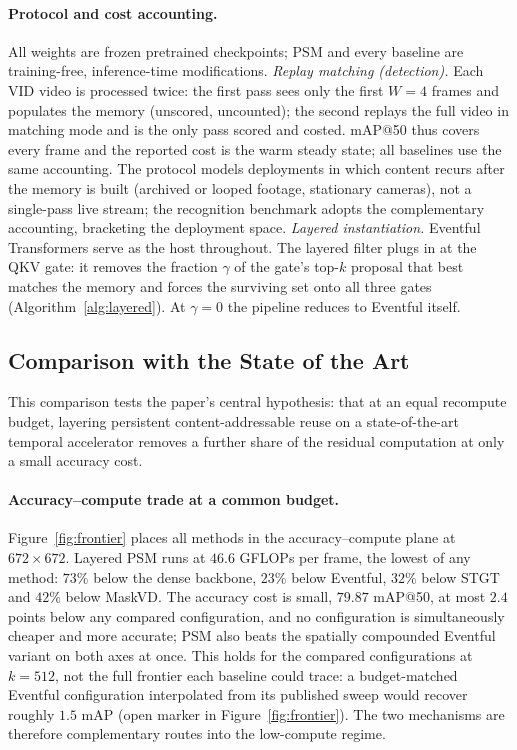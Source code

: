 \documentclass[letterpaper]{article}
\begin{document}
\paragraph{Protocol and cost accounting.}
All weights are frozen pretrained checkpoints; PSM and every baseline
are training-free, inference-time modifications.
%
\emph{Replay matching (detection).} Each VID video is processed twice:
the first pass sees only the first $W = 4$ frames and populates the
memory (unscored, uncounted); the second replays the full video in
matching mode and is the only pass scored and costed. mAP@50 thus covers
every frame and the reported cost is the warm steady state; all
baselines use the same accounting. The
protocol models deployments in which content recurs after the memory
is built (archived or looped footage, stationary cameras), not a
single-pass live stream; the recognition benchmark adopts the
complementary accounting, bracketing the deployment space.
%
\emph{Layered instantiation.} Eventful Transformers \cite{eventful}
serve as the host throughout. The layered filter plugs in at the QKV
gate: it removes the fraction $\gamma$ of the gate's top-$k$ proposal
that best matches the memory and forces the surviving set onto all
three gates (Algorithm~\ref{alg:layered}). At $\gamma = 0$ the pipeline
reduces to Eventful itself.

\subsection{Comparison with the State of the Art}
\label{sec:eval-sota}

This comparison tests the paper's central hypothesis: that at an equal
recompute budget, layering persistent content-addressable reuse on a
state-of-the-art temporal accelerator removes a further share of the
residual computation at only a small accuracy cost.

\paragraph{Accuracy--compute trade at a common budget.}
Figure~\ref{fig:frontier} places all methods in the accuracy--compute
plane at $672 \times 672$. Layered PSM runs at $46.6$ GFLOPs per
frame, the lowest of any method: $73\%$ below the dense backbone,
$23\%$ below Eventful, $32\%$ below STGT and $42\%$ below MaskVD. The
accuracy cost is small, $79.87$ mAP@50, at most $2.4$ points below any
compared configuration, and no configuration is simultaneously cheaper
and more accurate; PSM also beats the spatially compounded Eventful
variant on both axes at once. This holds for the compared configurations at $k = 512$, not the full
frontier each baseline could trace: a budget-matched Eventful
configuration interpolated from its published sweep would recover
roughly $1.5$ mAP (open marker in
Figure~\ref{fig:frontier}). The two mechanisms are therefore
complementary routes into the low-compute regime.
\end{document}

